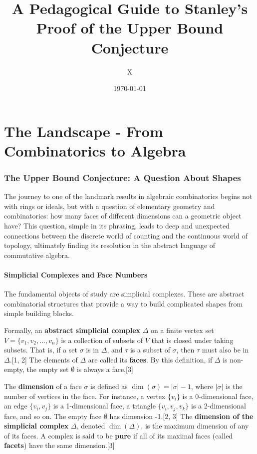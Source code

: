 \documentclass[11pt]{article}
\title{A Pedagogical Guide to Stanley's Proof of the Upper Bound Conjecture}
\author{X}
\date{\today}
\begin{document}
\maketitle

\part{The Landscape - From Combinatorics to Algebra}

\section{The Upper Bound Conjecture: A Question About Shapes}

The journey to one of the landmark results in algebraic combinatorics begins not with rings or ideals, but with a question of elementary geometry and combinatorics: how many faces of different dimensions can a geometric object have? This question, simple in its phrasing, leads to deep and unexpected connections between the discrete world of counting and the continuous world of topology, ultimately finding its resolution in the abstract language of commutative algebra.

\subsection{Simplicial Complexes and Face Numbers}

The fundamental objects of study are simplicial complexes. These are abstract combinatorial structures that provide a way to build complicated shapes from simple building blocks.

Formally, an \textbf{abstract simplicial complex} $\Delta$ on a finite vertex set $V = \{v_1, v_2, \ldots, v_n\}$ is a collection of subsets of $V$ that is closed under taking subsets. That is, if a set $\sigma$ is in $\Delta$, and $\tau$ is a subset of $\sigma$, then $\tau$ must also be in $\Delta$.[1, 2] The elements of $\Delta$ are called its \textbf{faces}. By this definition, if $\Delta$ is non-empty, the empty set $\emptyset$ is always a face.[3]

The \textbf{dimension} of a face $\sigma$ is defined as $\dim(\sigma) = |\sigma| - 1$, where $|\sigma|$ is the number of vertices in the face. For instance, a vertex $\{v_i\}$ is a 0-dimensional face, an edge $\{v_i, v_j\}$ is a 1-dimensional face, a triangle $\{v_i, v_j, v_k\}$ is a 2-dimensional face, and so on. The empty face $\emptyset$ has dimension -1.[2, 3] The \textbf{dimension of the simplicial complex} $\Delta$, denoted $\dim(\Delta)$, is the maximum dimension of any of its faces. A complex is said to be \textbf{pure} if all of its maximal faces (called \textbf{facets}) have the same dimension.[3]
\end{document}
